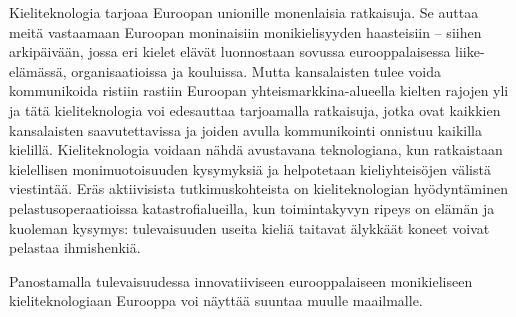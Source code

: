 \documentclass{../../metanetpaper}
\begin{document}
\begin{Parallel}[c]{79mm}{78mm}
{%
Kieliteknologia tarjoaa Euroopan unionille monenlaisia ratkaisuja. Se auttaa
meitä vastaamaan Euroopan moninaisiin monikielisyyden haasteisiin – siihen
arkipäivään, jossa eri kielet elävät luonnostaan sovussa eurooppalaisessa
liike-elämässä, organisaatioissa ja kouluissa. Mutta kansalaisten tulee voida
kommunikoida ristiin rastiin Euroopan yhteismarkkina-alueella kielten rajojen
yli ja tätä kieliteknologia voi edesauttaa tarjoamalla ratkaisuja, jotka ovat
kaikkien kansalaisten saavutettavissa ja joiden avulla kommunikointi
onnistuu kaikilla kielillä. Kieliteknologia voidaan nähdä avustavana
teknologiana, kun ratkaistaan kielellisen monimuotoisuuden kysymyksiä ja
helpotetaan kieliyhteisöjen välistä viestintää. Eräs aktiivisista tutkimuskohteista 
on kieliteknologian hyödyntäminen pelastusoperaatioissa katastrofialueilla, 
kun toimintakyvyn ripeys on elämän ja kuoleman kysymys: tulevaisuuden useita 
kieliä taitavat älykkäät koneet voivat pelastaa ihmishenkiä.

Panostamalla tulevaisuudessa innovatiiviseen eurooppalaiseen monikieliseen
kieliteknologiaan Eurooppa voi näyttää suuntaa muulle maailmalle.


}

\end{Parallel}
\end{document}
